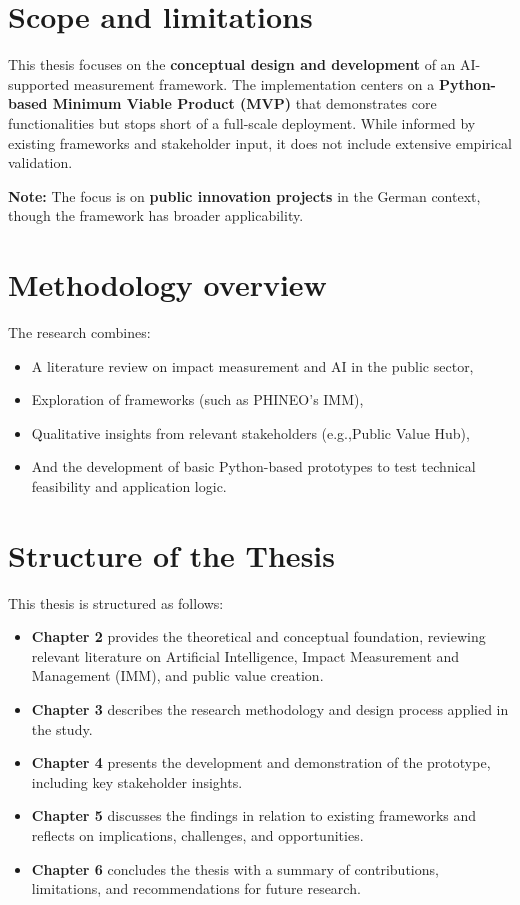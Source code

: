 \section{Scope and limitations}\label{sec:scope-and-limitations}

This thesis focuses on the \textbf{conceptual design and development} of an AI-supported measurement framework.
The implementation centers on a \textbf{Python-based Minimum Viable Product (MVP)} that demonstrates core functionalities but stops short of a full-scale deployment.
While informed by existing frameworks and stakeholder input, it does not include extensive empirical validation.

\medskip
\noindent\textbf{Note:} The focus is on \textbf{public innovation projects} in the German context, though the framework has broader applicability.
\medskip

\section{Methodology overview}\label{sec:methodology-overview}

The research combines:
\begin{itemize}
\item
A literature review on impact measurement and AI in the public sector,
\item
Exploration of frameworks (such as PHINEO’s IMM),
\item
Qualitative insights from relevant stakeholders (e.g.,Public Value Hub),
\item
And the development of basic Python-based prototypes to test technical feasibility and application logic.
\end{itemize}

\section{Structure of the Thesis}\label{sec:structure-of-the-thesis}

This thesis is structured as follows:

\begin{itemize}
    \item \textbf{Chapter 2} provides the theoretical and conceptual foundation, reviewing relevant literature on Artificial Intelligence, Impact Measurement and Management (IMM), and public value creation.
    \item \textbf{Chapter 3} describes the research methodology and design process applied in the study.
    \item \textbf{Chapter 4} presents the development and demonstration of the prototype, including key stakeholder insights.
    \item \textbf{Chapter 5} discusses the findings in relation to existing frameworks and reflects on implications, challenges, and opportunities.
    \item \textbf{Chapter 6} concludes the thesis with a summary of contributions, limitations, and recommendations for future research.
\end{itemize}